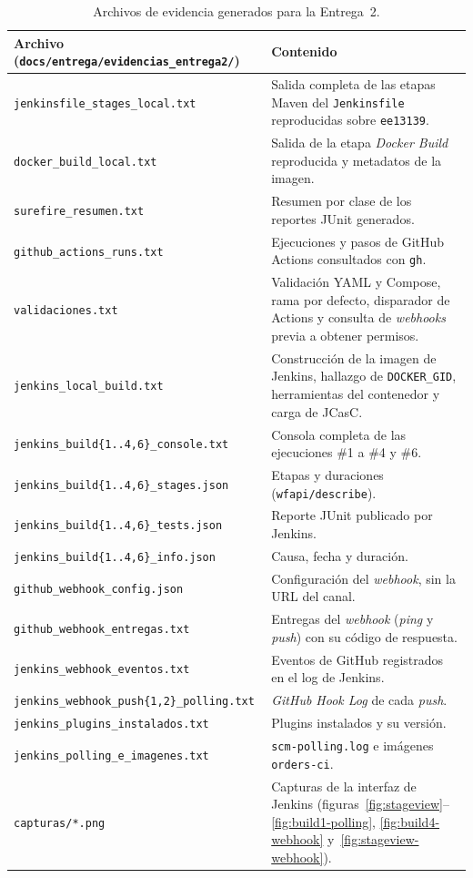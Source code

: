 \documentclass[11pt,a4paper]{article}
\begin{document}
\begin{table}[H]
\centering
\small
\begin{tabularx}{\textwidth}{@{}l L@{}}
\toprule
\textbf{Archivo (\texttt{docs/entrega/evidencias\_entrega2/})} & \textbf{Contenido}\\
\midrule
\texttt{jenkinsfile\_stages\_local.txt} & Salida completa de las etapas Maven del
\texttt{Jenkinsfile} reproducidas sobre \texttt{ee13139}.\\
\texttt{docker\_build\_local.txt} & Salida de la etapa \emph{Docker Build} reproducida y metadatos de
la imagen.\\
\texttt{surefire\_resumen.txt} & Resumen por clase de los reportes JUnit generados.\\
\texttt{github\_actions\_runs.txt} & Ejecuciones y pasos de GitHub Actions consultados con \texttt{gh}.\\
\texttt{validaciones.txt} & Validación YAML y Compose, rama por defecto, disparador de Actions y
consulta de \emph{webhooks} previa a obtener permisos.\\
\texttt{jenkins\_local\_build.txt} & Construcción de la imagen de Jenkins, hallazgo de
\texttt{DOCKER\_GID}, herramientas del contenedor y carga de JCasC.\\
\texttt{jenkins\_build\{1..4,6\}\_console.txt} & Consola completa de las ejecuciones \#1 a \#4 y \#6.\\
\texttt{jenkins\_build\{1..4,6\}\_stages.json} & Etapas y duraciones (\texttt{wfapi/describe}).\\
\texttt{jenkins\_build\{1..4,6\}\_tests.json} & Reporte JUnit publicado por Jenkins.\\
\texttt{jenkins\_build\{1..4,6\}\_info.json} & Causa, fecha y duración.\\
\texttt{github\_webhook\_config.json} & Configuración del \emph{webhook}, sin la URL del canal.\\
\texttt{github\_webhook\_entregas.txt} & Entregas del \emph{webhook} (\emph{ping} y \emph{push}) con su código de respuesta.\\
\texttt{jenkins\_webhook\_eventos.txt} & Eventos de GitHub registrados en el log de Jenkins.\\
\texttt{jenkins\_webhook\_push\{1,2\}\_polling.txt} & \emph{GitHub Hook Log} de cada \emph{push}.\\
\texttt{jenkins\_plugins\_instalados.txt} & Plugins instalados y su versión.\\
\texttt{jenkins\_polling\_e\_imagenes.txt} & \texttt{scm-polling.log} e imágenes \texttt{orders-ci}.\\
\texttt{capturas/*.png} & Capturas de la interfaz de Jenkins (figuras~\ref{fig:stageview}--\ref{fig:build1-polling},
\ref{fig:build4-webhook} y~\ref{fig:stageview-webhook}).\\
\bottomrule
\end{tabularx}
\caption{Archivos de evidencia generados para la Entrega~2.}
\label{tab:archivos-evid}
\end{table}
\end{document}
